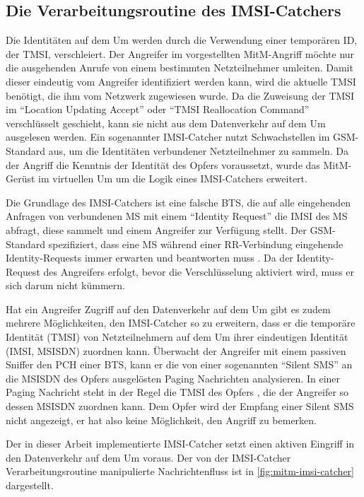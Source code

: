 \subsection{Die Verarbeitungsroutine des IMSI-Catchers}

Die Identitäten auf dem \ac{Um} werden durch die Verwendung einer temporären ID, der \ac{TMSI}, verschleiert. Der Angreifer im vorgestellten \ac{MitM}-Angriff möchte nur die ausgehenden Anrufe von einem bestimmten Netzteilnehmer umleiten. Damit dieser eindeutig vom Angreifer identifiziert werden kann, wird die aktuelle \ac{TMSI} benötigt, die ihm vom Netzwerk zugewiesen wurde. Da die Zuweisung der \ac{TMSI} im "`Location Updating Accept"' oder "`TMSI Reallocation Command"' verschlüsselt geschieht, kann sie nicht aus dem Datenverkehr auf dem \ac{Um} ausgelesen werden. Ein sogenannter \ac{IMSI}-Catcher nutzt Schwachstellen im \ac{GSM}-Standard aus, um die Identitäten verbundener Netzteilnehmer zu sammeln. Da der Angriff die Kenntnis der Identität des Opfers voraussetzt, wurde das \ac{MitM}-Gerüst im virtuellen \ac{Um} um die Logik eines \ac{IMSI}-Catchers erweitert.

Die Grundlage des \ac{IMSI}-Catchers ist eine falsche \ac{BTS}, die auf alle eingehenden Anfragen von verbundenen \ac{MS} mit einem "`Identity Request"' die \ac{IMSI} des \ac{MS} abfragt, diese sammelt und einem Angreifer zur Verfügung stellt. Der \ac{GSM}-Standard spezifiziert, dass eine \ac{MS} während einer \ac{RR}-Verbindung eingehende Identity-Requests immer erwarten und beantworten muss . Da der Identity-Request des Angreifers erfolgt, bevor die Verschlüsselung aktiviert wird, muss er sich darum nicht kümmern.

Hat ein Angreifer Zugriff auf den Datenverkehr auf dem \ac{Um} gibt es zudem mehrere Möglichkeiten, den IMSI-Catcher so zu erweitern, dass er die temporäre Identität (\ac{TMSI}) von Netzteilnehmern auf dem \ac{Um} ihrer eindeutigen Identität (\ac{IMSI}, \ac{MSISDN}) zuordnen kann. Überwacht der Angreifer mit einem passiven Sniffer den \ac{PCH} einer \ac{BTS}, kann er die von einer sogenannten "`Silent \ac{SMS}"' an die \ac{MSISDN} des Opfers ausgelösten Paging Nachrichten analysieren. In einer Paging Nachricht steht in der Regel die \ac{TMSI} des Opfers , die der Angreifer so dessen \ac{MSISDN} zuordnen kann. Dem Opfer wird der Empfang einer Silent \ac{SMS} nicht angezeigt, er hat also keine Möglichkeit, den Angriff zu bemerken.

Der in dieser Arbeit implementierte \ac{IMSI}-Catcher setzt einen aktiven Eingriff in den Datenverkehr auf dem \ac{Um} voraus. Der von der \ac{IMSI}-Catcher Verarbeitungsroutine manipulierte Nachrichtenfluss ist in \autoref{fig:mitm-imsi-catcher} dargestellt.

